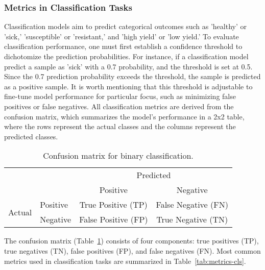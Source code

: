 \subsubsection{Metrics in Classification Tasks}

Classification models aim to predict categorical outcomes such as 'healthy' or 'sick,' 'susceptible' or 'resistant,' and 'high yield' or 'low yield.’ To evaluate classification performance, one must first establish a confidence threshold to dichotomize the prediction probabilities. For instance, if a classification model predict a sample as 'sick' with a 0.7 probability, and the threshold is set at 0.5. Since the 0.7 prediction probability exceeds the threshold, the sample is predicted as a positive sample. It is worth mentioning that this threshold is adjustable to fine-tune model performance for particular focus, such as minimizing false positives or false negatives. All classification metrics are derived from the confusion matrix, which summarizes the model's performance in a 2x2 table, where the rows represent the actual classes and the columns represent the predicted classes.

\begin{table}[H]
    \caption{Confusion matrix for binary classification.}
    \centering
    \begin{tabular}{ll|cc}
        \toprule
        \multicolumn{2}{c|}{\multirow{2}{*}{}} & \multicolumn{2}{c}{Predicted} \\
        \multicolumn{2}{c|}{} & Positive & Negative \\
        \midrule
        \multirow{2}{*}{Actual} & Positive & True Positive (TP) & False Negative (FN) \\
        & Negative & False Positive (FP) & True Negative (TN) \\
        \bottomrule
    \end{tabular}
    \label{tab:confusion-matrix}
\end{table}


The confusion matrix (Table~\ref{tab:confusion-matrix}) consists of four components: true positives (TP), true negatives (TN), false positives (FP), and false negatives (FN). Most common metrics used in classification tasks are summarized in Table~\ref{tab:metrics-cls}.

